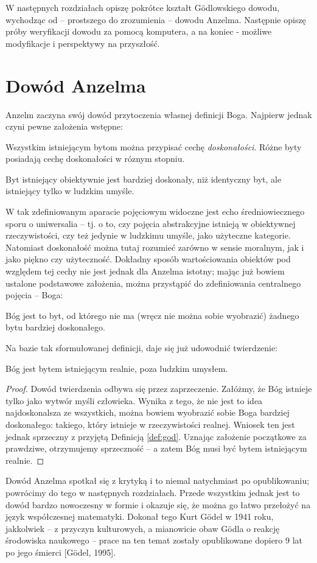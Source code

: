 \documentclass[
    showauthor=true,   %
    showsubject=false, %
    showdate=true,     %
    hyphenation=true   %
]{src/wut-report}
\begin{document}
W następnych rozdziałach opiszę pokrótce kształt G\"odlowskiego dowodu, wychodząc od -- prostszego do zrozumienia -- dowodu Anzelma. Następnie opiszę próby weryfikacji dowodu za pomocą komputera, a na koniec - możliwe modyfikacje i perspektywy na przyszłość.

\section{Dowód Anzelma}
Anzelm zaczyna swój dowód przytoczenia własnej definicji Boga. Najpierw jednak czyni pewne założenia wstępne:
\begin{axiom} \label{axiom:1}
	Wszystkim istniejącym bytom można przypisać cechę \emph{doskonałości}. Różne byty posiadają cechę doskonałości w róznym stopniu.
\end{axiom}
\begin{axiom} \label{axiom:2}
	Byt istniejący obiektywnie jest bardziej doskonały, niż identyczny byt, ale istniejący tylko w ludzkim umyśle.
\end{axiom}
W tak zdefiniowanym aparacie pojęciowym widoczne jest echo średniowiecznego sporu o uniwersalia -- tj. o to, czy pojęcia abstrakcyjne istnieją w obiektywnej rzeczywistości, czy też jedynie w ludzkimu umyśle, jako użyteczne kategorie. Natomiast doskonałość można tutaj rozumieć zarówno w sensie moralnym, jak i jako piękno czy użyteczność. Dokładny sposób wartościowania obiektów pod względem tej cechy nie jest jednak dla Anzelma istotny; mając już bowiem ustalone podstawowe założenia, można przystąpić do zdefiniowania centralnego pojęcia -- Boga:
\begin{definition} \label{def:god}
	Bóg jest to byt, od którego nie ma (wręcz nie można sobie wyobrazić) żadnego bytu bardziej doskonałego.
\end{definition}
Na bazie tak sformułowanej definicji, daje się już udowodnić twierdzenie:
\begin{theorem} \label{theorem:god}
	Bóg jest bytem istniejącym realnie, poza ludzkim umysłem.
\end{theorem}
\begin{proof}
	Dowód twierdzenia odbywa się przez zaprzeczenie. Załóżmy, że Bóg istnieje tylko jako wytwór myśli człowieka. Wynika z tego, że nie jest to idea najdoskonalsza ze wszystkich, można bowiem wyobrazić sobie Boga bardziej doskonałego: takiego, który istnieje w rzeczywistości realnej. Wniosek ten jest jednak sprzeczny z przyjętą Definicją \ref{def:god}. Uznając założenie początkowe za prawdziwe, otrzymujemy sprzeczność -- a zatem Bóg musi być bytem istniejącym realnie.
\end{proof}
Dowód Anzelma spotkał się z krytyką i to niemal natychmiast po opublikowaniu; powrócimy do tego w następnych rozdziałach. Przede wszystkim jednak jest to dowód bardzo nowoczesny w formie i okazuje się, że można go łatwo przełożyć na język współczesnej matematyki. Dokonał tego Kurt G\"odel w 1941 roku, jakkolwiek -- z przyczyn kulturowych, a mianowicie obaw G\"odla o reakcję środowiska naukowego -- prace na ten temat zostały opublikowane dopiero 9 lat po jego śmierci [G\"odel, 1995].
\end{document}
